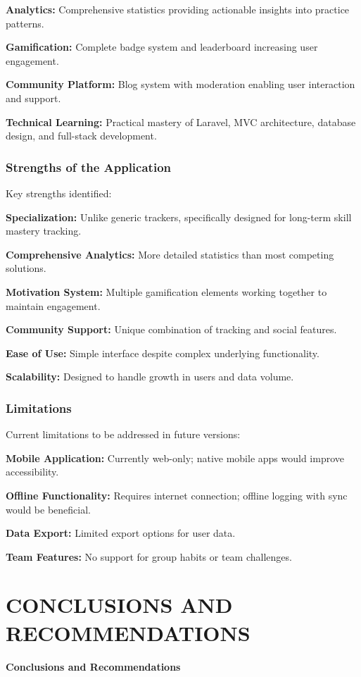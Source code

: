 \documentclass[12pt,a4paper]{report}
\newcommand{\JustifiedNormal}{\fontsize{12}{14}\selectfont\justifying\setlength{\parindent}{0pt}}
\begin{document}
\textbf{Analytics:} Comprehensive statistics providing actionable insights into practice patterns.

\textbf{Gamification:} Complete badge system and leaderboard increasing user engagement.

\textbf{Community Platform:} Blog system with moderation enabling user interaction and support.

\textbf{Technical Learning:} Practical mastery of Laravel, MVC architecture, database design, and full-stack development.

\subsection{Strengths of the Application}
\JustifiedNormal
Key strengths identified:

\textbf{Specialization:} Unlike generic trackers, specifically designed for long-term skill mastery tracking.

\textbf{Comprehensive Analytics:} More detailed statistics than most competing solutions.

\textbf{Motivation System:} Multiple gamification elements working together to maintain engagement.

\textbf{Community Support:} Unique combination of tracking and social features.

\textbf{Ease of Use:} Simple interface despite complex underlying functionality.

\textbf{Scalability:} Designed to handle growth in users and data volume.

\subsection{Limitations}
\JustifiedNormal
Current limitations to be addressed in future versions:

\textbf{Mobile Application:} Currently web-only; native mobile apps would improve accessibility.

\textbf{Offline Functionality:} Requires internet connection; offline logging with sync would be beneficial.

\textbf{Data Export:} Limited export options for user data.

\textbf{Team Features:} No support for group habits or team challenges.

\clearpage

\chapter{CONCLUSIONS AND RECOMMENDATIONS}
\begin{center}
  {\fontsize{14}{17}\selectfont\bfseries Conclusions and Recommendations}
\end{center}
\vspace{1em}
\end{document}

